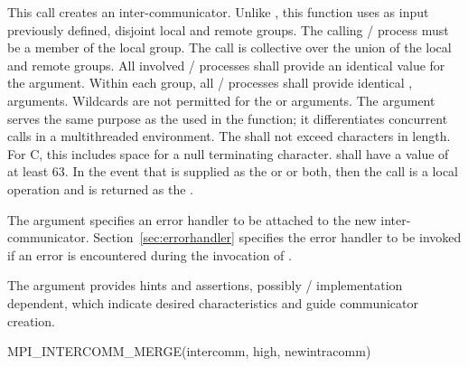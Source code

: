 \noindent This call creates an inter-communicator.
Unlike , this function uses as input previously defined, disjoint local and remote groups.
The calling \MPI/ process must be a member of the local group.
The call is collective over the union of the local and remote groups.
All involved \MPI/ processes shall provide an identical value for the  argument.
Within each group, all \MPI/ processes shall provide identical ,  arguments.
Wildcards are not permitted for the  or  arguments.
The  argument serves the same purpose as the  used in the  function;
it differentiates concurrent calls in a multithreaded environment.
The  shall not exceed  characters in length.
For C, this includes space for a null terminating character.
 shall have a value of at least 63.
In the event that  is supplied as the  or  or both,
then the call is a local operation and  is returned as the .

The  argument specifies an
error handler to be attached to the new inter-communicator.
Section~\ref{sec:errorhandler} specifies the error handler to be invoked 
if an error is encountered during the invocation of .

The  argument provides hints and assertions,
possibly \MPI/ implementation dependent,
which indicate desired characteristics and guide communicator creation.


%
\begin{funcdef}{MPI\_INTERCOMM\_MERGE}{(\mbox{intercomm}, \mbox{high}, \mbox{newintracomm})}
\end{funcdef}

